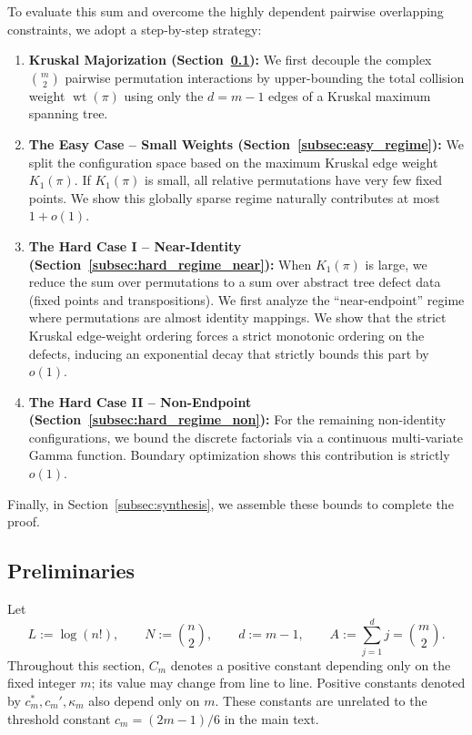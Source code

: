 \documentclass[10pt,a4paper]{amsart}
\newcommand{\wt}{\operatorname{wt}}
\begin{document}
To evaluate this sum and overcome the highly dependent pairwise overlapping constraints, we adopt a step-by-step strategy:
\begin{enumerate}
    \item \textbf{Kruskal Majorization (Section~\ref{subsec:preliminaries}):} We first decouple the complex \(\binom{m}{2}\) pairwise permutation interactions by upper-bounding the total collision weight \(\wt(\pi)\) using only the \(d = m-1\) edges of a Kruskal maximum spanning tree.
    \item \textbf{The Easy Case -- Small Weights (Section~\ref{subsec:easy_regime}):} We split the configuration space based on the maximum Kruskal edge weight \(K_1(\pi)\). If \(K_1(\pi)\) is small, all relative permutations have very few fixed points. We show this globally sparse regime naturally contributes at most \(1+o(1)\).
    \item \textbf{The Hard Case I -- Near-Identity (Section~\ref{subsec:hard_regime_near}):} When \(K_1(\pi)\) is large, we reduce the sum over permutations to a sum over abstract tree defect data (fixed points and transpositions). We first analyze the ``near-endpoint'' regime where permutations are almost identity mappings. We show that the strict Kruskal edge-weight ordering forces a strict monotonic ordering on the defects, inducing an exponential decay that strictly bounds this part by \(o(1)\).
    \item \textbf{The Hard Case II -- Non-Endpoint (Section~\ref{subsec:hard_regime_non}):} For the remaining non-identity configurations, we bound the discrete factorials via a continuous multi-variate Gamma function. Boundary optimization shows this contribution is strictly $o(1)$.
\end{enumerate}

Finally, in Section~\ref{subsec:synthesis}, we assemble these bounds to complete the proof. 



\subsection{Preliminaries}\label{subsec:preliminaries}

Let
\[
        L:=\log(n!), \qquad N:=\binom n2,
        \qquad d:=m-1,
        \qquad A:=\sum_{j=1}^d j=\binom m2 .
\]
Throughout this section, $C_m$ denotes a positive constant depending only on the fixed integer $m$; its value may change from line to line. Positive constants denoted by $c_m^\ast,c_m',\kappa_m$ also depend only on $m$. These constants are unrelated to the threshold constant $c_m=(2m-1)/6$ in the main text.
\end{document}
